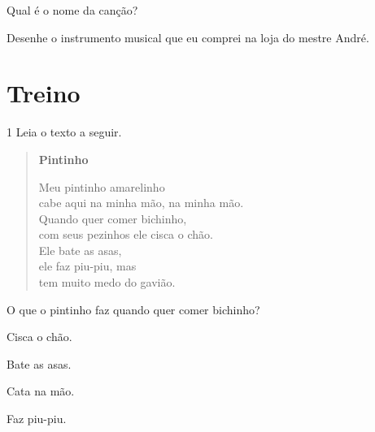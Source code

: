 
\begin{escolha}
\item Qual é o nome da canção?\\

\item Desenhe o instrumento musical que eu comprei na loja do mestre André.

\begin{mdframed}[linewidth=2pt,linecolor=salmao,roundcorner=10pt]
\vspace{3cm}
\end{mdframed}
\end{escolha}

\section*{Treino}

\num{1} Leia o texto a seguir.

\begin{myquote}
\begin{verse}
\textbf{Pintinho}

Meu pintinho amarelinho\\
cabe aqui na minha mão, na minha mão.\\
Quando quer comer bichinho,\\ 
com seus pezinhos ele cisca o chão.\\
Ele bate as asas,\\
ele faz piu-piu, mas\\ 
tem muito medo do gavião.
\end{verse}

\end{myquote}

\pagebreak
O que o pintinho faz quando quer comer bichinho?

\begin{multicols}{2}
\begin{escolha}
	\item Cisca o chão.

	\item Bate as asas.

	\item Cata na mão.

	\item Faz piu-piu.
\end{escolha}
\end{multicols}


